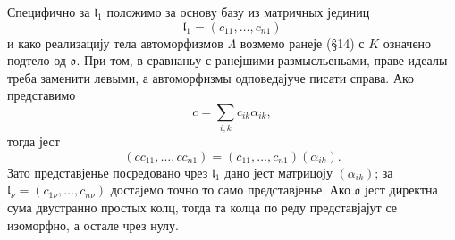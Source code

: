 ﻿\documentclass[11pt]{article}
\providecommand{\mo}{\mathfrak{o}}
\providecommand{\ml}{\mathfrak{l}}
\begin{document}
Специфично за $\ml_1$ положимо за основу базу из матричных јединиц
\[
        \ml_1=(c_{11},\ldots,c_{n1})
\]
и како реализацију тела автоморфизмов $\Lambda$ возмемо ранеје (§14) с $K$ означено подтело од $\mo$. При том, в сравнаньу с ранејшими размысльеньами, праве идеалы треба заменити левыми, а автоморфизмы одповедајуче писати справа. Ако представимо
\[
        c=\sum_{i,k} c_{ik}\alpha_{ik},
\]
тогда јест
\[
        (cc_{11},\ldots,cc_{n1})=(c_{11},\ldots,c_{n1})(\alpha_{ik}).
\]
Зато представјенье посредовано чрез $\ml_1$ дано јест матрицоју $(\alpha_{ik})$; за $\ml_\nu=(c_{1\nu},\ldots,c_{n\nu})$ достајемо точно то само представјенье. Ако $\mo$ јест директна сума двустранно простых колц, тогда та колца по реду представјајут се изоморфно, а остале чрез нулу.
\end{document}
